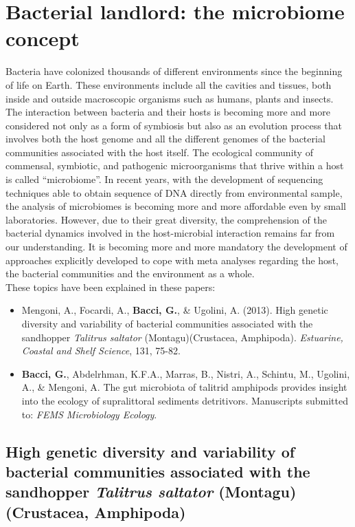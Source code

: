 \logvartrue
\chapter{Bacterial landlord: the microbiome concept}
Bacteria have colonized thousands of different environments since the beginning of life on Earth. These environments include all the cavities and tissues, both inside and outside macroscopic organisms such as humans, plants and insects. The interaction between bacteria and their hosts is becoming more and more considered not only as a form of symbiosis but also as an evolution process that involves both the host genome and all the different genomes of the bacterial communities associated with the host itself. The ecological community of commensal, symbiotic, and pathogenic microorganisms that thrive within a host is called ``microbiome''. In recent years, with the development of sequencing techniques able to obtain sequence of DNA directly from environmental sample, the analysis of microbiomes is becoming more and more affordable even by small laboratories. However, due to their great diversity, the comprehension of the bacterial dynamics involved in the host-microbial interaction remains far from our understanding. It is becoming more and more mandatory the development of approaches explicitly developed to cope with meta analyses regarding the host, the bacterial communities and the environment as a whole.\\
These topics have been explained in these papers:
\vspace{-2mm}
\begin{itemize}
\item Mengoni, A., Focardi, A., \textbf{Bacci, G.}, \& Ugolini, A. (2013). High genetic diversity and variability of bacterial communities associated with the sandhopper \textit{Talitrus saltator} (Montagu)(Crustacea, Amphipoda). \textit{Estuarine, Coastal and Shelf Science}, 131, 75-82.
\item \textbf{Bacci, G.}, Abdelrhman, K.F.A., Marras, B., Nistri, A., Schintu, M., Ugolini, A., \& Mengoni, A. The gut microbiota of talitrid amphipods provides insight into the ecology of supralittoral sediments detritivors. Manuscripts submitted to: \textit{FEMS Microbiology Ecology}.
\end{itemize}

\section[High genetic diversity and variability of bacterial communities associated with the sandhopper \textit{Talitrus saltator} (Montagu) (Crustacea, Amphipoda)]{High genetic diversity and variability of bacterial communities associated with the sandhopper \textit{Talitrus saltator} (Montagu) (Crustacea, Amphipoda)%
}

